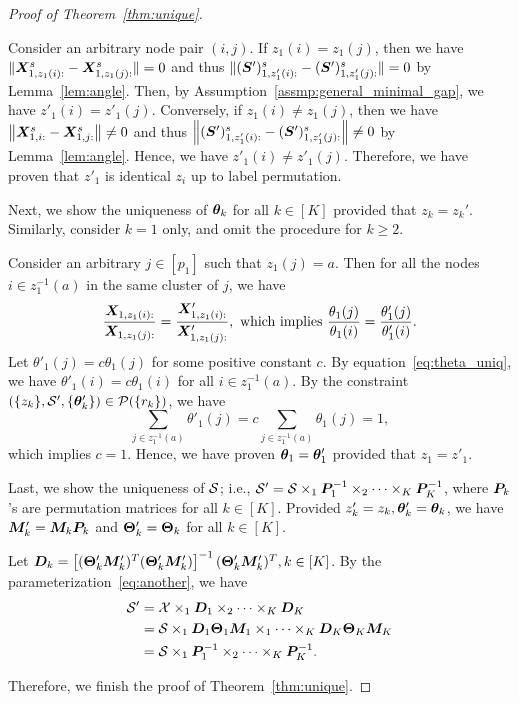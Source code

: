 \documentclass[journal]{IEEEtran}
\theoremstyle{definition}
\theoremstyle{definition}
\newcommand{\off}[1]{\left[#1\right]}
\begin{document}
\begin{proof}[Proof of Theorem~\ref{thm:unique}]
\begin{enumerate}[wide]
Consider an arbitrary node pair $(i,j)$. If $z_1(i) = z_1(j)$, then we have $\lVert\bm X_{1, z_1(i):}^s - \bm X_{1, z_1(j):}^s \rVert = 0$ and thus $\lVert (\bm S')_{1, z'_1(i):}^{s} - (\bm S')_{1, z'_1(j):}^{s} \rVert = 0$ by Lemma~\ref{lem:angle}. Then, by Assumption~\eqref{assmp:general_minimal_gap}, we have $z'_1(i) = z'_1(j)$. Conversely, if $z_1(i) \neq z_1(j)$, then we have $ \left\lVert\bm X_{1,i:}^s - \bm X_{1,j:}^s\right\rVert \neq 0$ and thus $\left\lVert (\bm S')_{1, z'_1(i):}^{s} - (\bm S')_{1, z'_1(j):}^{s} \right\rVert \neq 0$ by Lemma~\ref{lem:angle}. Hence, we have $z'_1(i) \neq z'_1(j)$. Therefore, we have proven that $z'_1$ is identical $z_i$ up to label permutation.

Next, we show the uniqueness of $\boldsymbol{\theta}_k$ for all $k \in [K]$ provided that $z_k = z_k'$. Similarly, consider $k=1$ only, and omit the procedure for $k\geq 2$. 

Consider an arbitrary $j \in [p_1]$ such that $z_1(j) = a$. Then for all the nodes $i \in  z_1^{-1}(a)$ in the same cluster of $j$, we have 
\begin{equation}
    \frac{\mX_{1,z_1(i):}}{\mX_{1,z_1(j):}} = \frac{\mX'_{1,z_1(i):}}{\mX'_{1,z_1(j):}}, \text{ which implies }  \frac{\theta_1(j)}{\theta_1(i)} = \frac{\theta'_1(j)}{\theta'_1(i)}.\label{eq:theta_uniq}
\end{equation}
Let $\theta'_1(j) = c\theta_1(j)$ for some positive constant $c$. By equation~\eqref{eq:theta_uniq}, we have $\theta'_1(i) = c \theta_1(i)$ for all $ i \in  z_1^{-1}(a)$. By the constraint $(\{z_k\}, \mathcal{S}', \{\boldsymbol{\theta}'_k\}) \in \mathcal{P}(\{r_k\})$, we have 
\begin{equation}
    \sum_{j \in z_1^{-1}(a)} \theta'_1(j) = c \sum_{j \in z_1^{-1}(a)} \theta_1(j) = 1,
\end{equation}
which implies $c = 1$. Hence, we have proven $\boldsymbol{\theta}_1 = \boldsymbol{\theta}'_1$ provided that $z_1 = z'_1$.

Last, we show the uniqueness of $\mathcal{S}$; i.e., $\mathcal{S}'=\mathcal{S}\times_1 \bm{P}^{-1}_1\times_2\cdots \times_K \bm{P}^{-1}_K$, where $\bm{P}_k$'s are permutation matrices for all $k\in[K]$.  Provided $z'_k = z_k, \boldsymbol{\theta}'_k = \boldsymbol{\theta}_k$, we have $\bm M'_k = \bm M_k \bm{P}_k$ and $\boldsymbol{\Theta}'_k = \boldsymbol{\Theta}_k$ for all $k \in [K]$. 

Let $\mD_k = \off{ (\mTheta'_k \mM'_k)^T (\mTheta'_k \mM'_k) }^{-1} (\mTheta'_k \mM'_k)^T, k \in [K]$. By the parameterization~\eqref{eq:another}, we have 
\begin{align}
    \mathcal{S}' &= \mathcal{X} \times_1 \bm{D}_1 \times_2 \cdots \times_K \bm{D}_K \\
    &= \mathcal{S} \times_1 \bm{D}_1 \boldsymbol{\Theta}_1 \bm M_1 \times_1 \cdots \times_K \bm{D}_K \boldsymbol{\Theta}_K \bm M_K \\
    &= \mathcal{S} \times_1 \bm{P}^{-1}_1 \times_2 \cdots \times_K \bm{P}^{-1}_K.
\end{align}


\end{enumerate}

Therefore, we finish the proof of Theorem~\ref{thm:unique}.
\end{proof}
\end{document}
